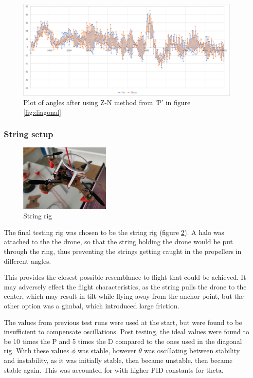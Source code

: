 \newpage

\begin{figure}[h!]
    \centering
    \includegraphics[width=\textwidth]{pictures/graphs/ZN.png}
    \caption{Plot of angles after using Z-N method from 'P' in figure \ref{fig:diagonal}}
    \label{fig:ZN}
\end{figure}

\subsubsection{String setup}
\begin{figure}
    \centering
    \includegraphics[width=0.4\textwidth]{pictures/String_rig.jpg}
    \caption{String rig}
    \label{fig:string_rig}
\end{figure}
The final testing rig was chosen to be the string rig (figure \ref{fig:string_rig}). A halo was attached to the the drone, so that the string holding the drone would be put through the ring, thus preventing the strings getting caught in the propellers in different angles.

This provides the closest possible resemblance to flight that could be achieved. It may adversely effect the flight characteristics, as the string pulls the drone to the center, which may result in tilt while flying away from the anchor point, but the other option was a gimbal, which introduced large friction.

The values from previous test runs were used at the start, but were found to be insufficient to compensate oscillations. Post testing, the ideal values were found to be 10 times the P and 5 times the D compared to the ones used in the diagonal rig. With these values $\phi$ was stable, however $\theta$ was oscillating between stability and instability, as it was initially stable, then became unstable, then became stable again. This was accounted for with higher PID constants for theta.

